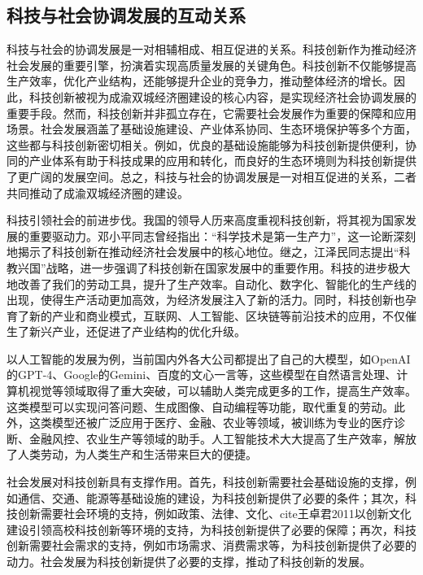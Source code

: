 \documentclass{CjC}
\begin{document}
\subsection{科技与社会协调发展的互动关系}

科技与社会的协调发展是一对相辅相成、相互促进的关系\cite{孙见荆2012科技}。科技创新作为推动经济社会发展的重要引擎，扮演着实现高质量发展的关键角色。科技创新不仅能够提高生产效率，优化产业结构，还能够提升企业的竞争力，推动整体经济的增长。因此，科技创新被视为成渝双城经济圈建设的核心内容，是实现经济社会协调发展的重要手段。然而，科技创新并非孤立存在，它需要社会发展作为重要的保障和应用场景。社会发展涵盖了基础设施建设、产业体系协同、生态环境保护等多个方面，这些都与科技创新密切相关。例如，优良的基础设施能够为科技创新提供便利，协同的产业体系有助于科技成果的应用和转化，而良好的生态环境则为科技创新提供了更广阔的发展空间。总之，科技与社会的协调发展是一对相互促进的关系，二者共同推动了成渝双城经济圈的建设。

科技引领社会的前进步伐\cite{葛金田2008论基于科技创新的经济}。我国的领导人历来高度重视科技创新，将其视为国家发展的重要驱动力。邓小平同志曾经指出：“科学技术是第一生产力”\cite{邓小平1992科学技术是第一生产力}，这一论断深刻地揭示了科技创新在推动经济社会发展中的核心地位。继之，江泽民同志提出“科教兴国”\cite{惠永正1998知识经济与科教兴国,秋石2004科教兴国论}战略，进一步强调了科技创新在国家发展中的重要作用。科技的进步极大地改善了我们的劳动工具，提升了生产效率。自动化、数字化、智能化的生产线的出现，使得生产活动更加高效，为经济发展注入了新的活力。同时，科技创新也孕育了新的产业和商业模式，互联网\cite{吴吉义2015移动互联网研究综述}、人工智能\cite{崔雍浩2019人工智能综述}、区块链\cite{曾诗钦2020区块链技术研究综述}等前沿技术的应用，不仅催生了新兴产业，还促进了产业结构的优化升级。

以人工智能的发展为例，当前国内外各大公司都提出了自己的大模型，如OpenAI的GPT-4\cite{floridi2020gpt}、Google的Gemini\cite{team2023gemini}、百度的文心一言\cite{zhang2019ernie}等，这些模型在自然语言处理、计算机视觉等领域取得了重大突破，可以辅助人类完成更多的工作，提高生产效率。这类模型可以实现问答问题\cite{wu2017visual}、生成图像\cite{elasri2022image}、自动编程\cite{wu2022promptchainer}等功能，取代重复的劳动。此外，这类模型还被广泛应用于医疗\cite{latif2019medical}、金融\cite{zheng2023deep}、农业\cite{kamilaris2018deep}等领域，被训练为专业的医疗诊断、金融风控、农业生产等领域的助手。人工智能技术大大提高了生产效率，解放了人类劳动，为人类生产和生活带来巨大的便捷。

社会发展对科技创新具有支撑作用。首先，科技创新需要社会基础设施的支撑，例如通信、交通、能源等基础设施的建设，为科技创新提供了必要的条件；其次，科技创新需要社会环境的支持，例如政策\cite{薛澜2018中国科技创新政策}、法律\cite{赵立新2002科技创新法律保障问题论略}、文化、cite{王卓君2011以创新文化建设引领高校科技创新}等环境的支持，为科技创新提供了必要的保障；再次，科技创新需要社会需求的支持，例如市场需求、消费需求等，为科技创新提供了必要的动力。社会发展为科技创新提供了必要的支撑，推动了科技创新的发展。
\end{document}
